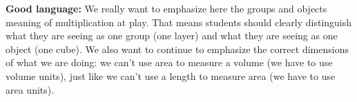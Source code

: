 \documentclass[nooutcomes,noauthor]{ximera}
\begin{document}
\begin{instructorNotes}
{\bf Good language:} We really want to emphasize here the groups and objects meaning of multiplication at play. That means students should clearly distinguish what they are seeing as one group (one layer) and what they are seeing as one object (one cube). We also want to continue to emphasize the correct dimensions of what we are doing: we can't use area to measure a volume (we have to use volume units), just like we can't use a length to measure area (we have to use area units).




\end{instructorNotes}
\end{document}
